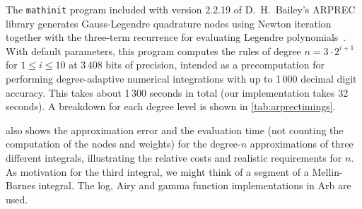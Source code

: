 \documentclass[nohypdvips,review]{siamart0216}
\begin{document}
The \texttt{mathinit} program included with version 2.2.19
of D.\ H.\ Bailey's ARPREC library
generates Gauss-Legendre quadrature nodes
using Newton iteration together with the three-term recurrence for evaluating
Legendre polynomials~\cite{bailey2002arprec,bailey2011high}.
With default parameters, this program computes the rules of degree $n = 3 \cdot 2^{i+1}$
for $1 \le i \le 10$ at 3\,408 bits of precision, intended as
a precomputation for performing
degree-adaptive numerical integrations with up to 1\,000 decimal digit accuracy.
This takes about 1\,300 seconds in total (our implementation takes 32
seconds).
A breakdown for each degree level
is shown in \cref{tab:arprectimings}.

 also shows the approximation error and the
evaluation time (not counting the computation of the nodes and weights)
for the degree-$n$ approximations of three different integrals,
illustrating the relative costs and realistic requirements for $n$.
As motivation for the third integral, we might think
of a segment of a Mellin-Barnes integral.
The log, Airy and gamma function implementations in Arb are used.
\end{document}
